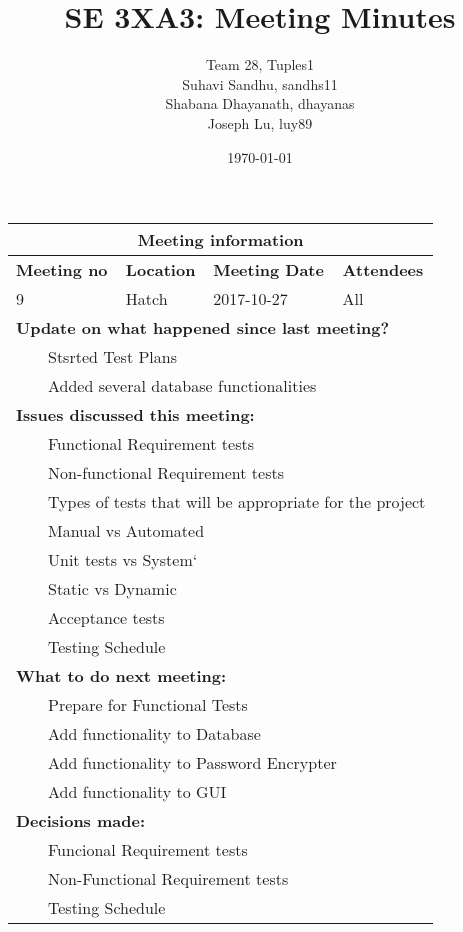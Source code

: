 \documentclass{article}
\title{SE 3XA3: Meeting Minutes}
\author{Team 28, Tuples1
		\\ Suhavi Sandhu, sandhs11
		\\ Shabana Dhayanath, dhayanas
		\\ Joseph Lu, luy89
}
\date{\today}
\newcommand{\tabitem}{~~\llap{\textbullet}~~}
\begin{document}
\begin{tabularx}{\textwidth}{| X || X || X || X |}

    \hline
    \hline
    \multicolumn{4}{|c|}{\textbf{Meeting information}}\\
    \hline
    \hline
        
    \textbf{Meeting no}& \textbf{Location}&\textbf{Meeting Date}&\textbf{Attendees}\\
    
    \hline

    9 & Hatch & 2017-10-27 & All\\
    
    \hline

    \multicolumn{4}{|l|}{\textbf{Update on what happened since last meeting?}}\\

    \multicolumn{4}{|l|}{\tabitem Stsrted Test Plans}\\
    \multicolumn{4}{|l|}{\tabitem Added several database functionalities}\\
	
    \hline

    \multicolumn{4}{|l|}{\textbf{Issues discussed this meeting:}}\\
    
    \multicolumn{4}{|l|}{\tabitem Functional Requirement tests}\\
    \multicolumn{4}{|l|}{\tabitem Non-functional Requirement tests}\\
    \multicolumn{4}{|l|}{\tabitem Types of tests that will be appropriate for the project}\\
    \multicolumn{4}{|l|}{\quad\tabitem Manual vs Automated}\\
    \multicolumn{4}{|l|}{\quad\tabitem Unit tests vs System`}\\
    \multicolumn{4}{|l|}{\quad\tabitem Static vs Dynamic}\\
    \multicolumn{4}{|l|}{\quad\tabitem Acceptance tests}\\
    \multicolumn{4}{|l|}{\tabitem Testing Schedule}\\

    \hline

    \multicolumn{4}{|l|}{\textbf{What to do next meeting:}}\\

    \multicolumn{4}{|l|}{\tabitem Prepare for Functional Tests}\\
    \multicolumn{4}{|l|}{\tabitem Add functionality to Database}\\
    \multicolumn{4}{|l|}{\tabitem Add functionality to Password Encrypter}\\
    \multicolumn{4}{|l|}{\tabitem Add functionality to GUI}\\

    \hline

    \multicolumn{4}{|l|}{\textbf{Decisions made:}}\\
    
    \multicolumn{4}{|l|}{\tabitem Funcional Requirement tests}\\
    \multicolumn{4}{|l|}{\tabitem Non-Functional Requirement tests}\\
    \multicolumn{4}{|l|}{\tabitem Testing Schedule}\\

    \hline


\end{tabularx}
\end{document}
